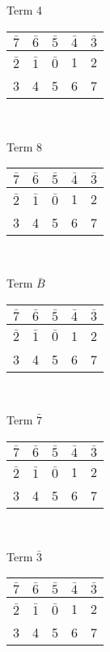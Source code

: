 \documentclass[12 pt]{article}%
\begin{document}
\begin{multicols}{4}
\begin{center}
    Term 4 \\
    \begin{tabular}{|c|c|c|c|c|}
      \hline
      $ \bar 7 $ & $ \bar 6 $ & $ \bar 5 $ & $\bar 4$ & $\bar 3 $ \\
      \hline
      $ \bar 2 $ & $ \bar 1 $ & $ \bar 0 $ & 1 & 2\\
      \hline
      3 & 4 & 5 & 6 & 7 \\
      \hline
    \end{tabular}\\
    \bigskip

    Term 8 \\
    \begin{tabular}{|c|c|c|c|c|}
      \hline
      $ \bar 7 $ & $ \bar 6 $ & $ \bar 5 $ & $\bar 4$ & $\bar 3 $ \\
      \hline
      $ \bar 2 $ & $ \bar 1 $ & $ \bar 0 $ & 1 & 2\\
      \hline
      3 & 4 & 5 & 6 & 7 \\
      \hline
    \end{tabular}\\
    \bigskip

    Term $\bar B$ \\
    \begin{tabular}{|c|c|c|c|c|}
      \hline
      $ \bar 7 $ & $ \bar 6 $ & $ \bar 5 $ & $\bar 4$ & $\bar 3 $ \\
      \hline
      $ \bar 2 $ & $ \bar 1 $ & $ \bar 0 $ & 1 & 2\\
      \hline
      3 & 4 & 5 & 6 & 7 \\
      \hline
    \end{tabular}\\
    \bigskip

    Term $\bar 7$ \\
    \begin{tabular}{|c|c|c|c|c|}
      \hline
      $ \bar 7 $ & $ \bar 6 $ & $ \bar 5 $ & $\bar 4$ & $\bar 3 $ \\
      \hline
      $ \bar 2 $ & $ \bar 1 $ & $ \bar 0 $ & 1 & 2\\
      \hline
      3 & 4 & 5 & 6 & 7 \\
      \hline
    \end{tabular}\\
    \bigskip

    Term $\bar 3$ \\
    \begin{tabular}{|c|c|c|c|c|}
      \hline
      $ \bar 7 $ & $ \bar 6 $ & $ \bar 5 $ & $\bar 4$ & $\bar 3 $ \\
      \hline
      $ \bar 2 $ & $ \bar 1 $ & $ \bar 0 $ & 1 & 2\\
      \hline
      3 & 4 & 5 & 6 & 7 \\
      \hline
    \end{tabular}\\
    \bigskip


\end{center}
\end{multicols}
\end{document}
